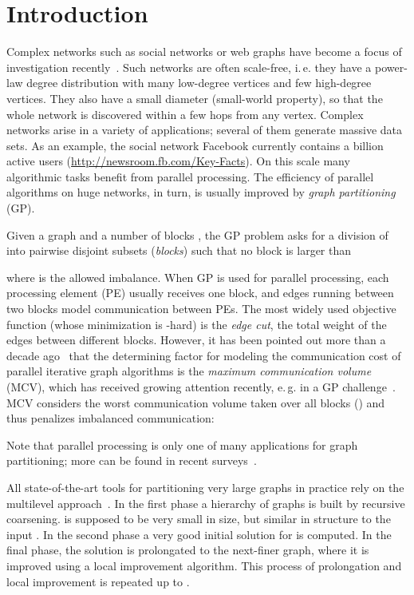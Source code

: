 \documentclass[pdftex]{llncs}
\newcommand{\eg}{e.\,g.\xspace}
\newcommand{\ie}{i.\,e.\xspace}
\numberwithin{equation}{section}
\numberwithin{example}{section}
\numberwithin{table}{section}
\begin{document}
\section{Introduction}
\label{sec:intro}
Complex networks such as social networks or web graphs have
become a focus of investigation recently~\cite{costa2011analyzing}.
Such networks are often scale-free, \ie they have a power-law
degree distribution with many low-degree vertices and few high-degree vertices.
They also have a small diameter (small-world property), 
so that the whole network is discovered within a few hops from any vertex.
Complex networks arise in a variety of applications; several of them generate massive data sets.
As an example, the social network Facebook currently contains a billion active 
users (\url{http://newsroom.fb.com/Key-Facts}).
On this scale many algorithmic tasks benefit from parallel processing.
The efficiency of parallel algorithms on huge networks, in turn,
is usually improved by \emph{graph partitioning} (GP).


Given a graph  and a number of blocks , the GP problem asks for a
division of  into  pairwise disjoint subsets 
(\emph{blocks}) such that no block is larger than

where  is the allowed imbalance. When GP is used for parallel processing, each 
processing element (PE) usually receives one block, and edges running between two blocks model communication
between PEs. The most widely used objective function (whose minimization is -hard) is the \emph{edge cut}, the total weight of the edges between different blocks.
However, it has been pointed out more than a decade ago~\cite{Hendrickson_graphpartitioning} that 
the determining factor for modeling the communication cost of parallel iterative graph algorithms is the
\emph{maximum communication volume} (MCV), which has received growing attention 
recently, \eg in a GP challenge~\cite{BaderMSW12dimacs}. 
MCV considers the worst communication volume taken over all blocks 
() and thus penalizes imbalanced communication:

Note that parallel processing is only one of many applications for graph partitioning; more can
be found in recent surveys~\cite{GPOverviewBook,SPPGPOverviewPaper}.

All state-of-the-art tools for partitioning very large graphs in
practice rely on the multilevel approach~\cite{SPPGPOverviewPaper}.
In the first phase a hierarchy of graphs  is built
by recursive coarsening.  is supposed to
 be very small in
size, but similar in structure to the input 
 . In the second
phase a very good initial solution for 
 is computed. In the
final phase, the solution is prolongated to the next-finer
 graph,
where it is improved using a local improvement algorithm. This
process of prolongation and local improvement is repeated up to
.
\end{document}
